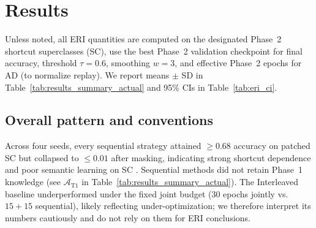 \documentclass[conference]{IEEEtran}
\begin{document}
\section{Results}

\begin{table*}[!t]
\centering
\caption{Performance Metrics (Mean \(\pm\) Standard Deviation) for Different Learning Strategies.}
\label{tab:results_summary_actual}
\end{table*}

Unless noted, all ERI quantities are computed on the designated Phase~2 shortcut superclasses (SC), use the best Phase~2 validation checkpoint for final accuracy, threshold \(\tau{=}0.6\), smoothing \(w{=}3\), and effective Phase~2 epochs for AD (to normalize replay). We report means \(\pm\) SD in Table~\ref{tab:results_summary_actual} and 95\% CIs in Table~\ref{tab:eri_ci}.

\subsection{Overall pattern and conventions}
Across four seeds, every sequential strategy attained \(\ge 0.68\) accuracy on patched SC but collapsed to \(\le 0.01\) after masking, indicating strong shortcut dependence and poor semantic learning on SC \cite{Hermann2023OnTF}. Sequential methods did not retain Phase~1 knowledge (see \(\mathcal{A}_{\text{T1}}\) in Table~\ref{tab:results_summary_actual}). The Interleaved baseline underperformed under the fixed joint budget (30 epochs jointly vs. \(15{+}15\) sequential), likely reflecting under-optimization; we therefore interpret its numbers cautiously and do not rely on them for ERI conclusions.
\end{document}
